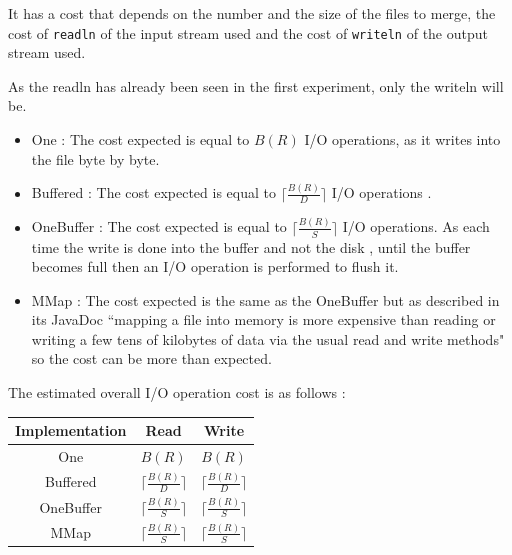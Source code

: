 \documentclass[12pt]{article}
\begin{document}
It has a cost that depends on the number and the size of the files to merge, the cost of \texttt{readln} of the input stream used and the cost of \texttt{writeln} of the output stream used.

As the readln has already been seen in the first experiment, only the writeln will be.

\begin{itemize}
    \item One : The cost expected is equal to $B(R)$ I/O operations, as it writes into the file byte by byte.
    \item Buffered : The cost expected is equal to $\lceil\frac{B(R)}{D}\rceil$ I/O operations \footnotemark.
    \item OneBuffer : The cost expected is equal to $\lceil\frac{B(R)}{S}\rceil$ I/O operations. As each time the write is done into the buffer and not the disk \footnotemark[\value{footnote}], until the buffer becomes full then an I/O operation is performed to flush it.
    \item MMap : The cost expected is the same as the OneBuffer but as described in its JavaDoc ``mapping a file into memory is more expensive than reading or writing a few tens of kilobytes of data via the usual read and write methods" so the cost can be more than expected.
\end{itemize}

The estimated overall I/O operation cost is as follows :

\begin{center}
\begin{tabular}{|c|c|c|}
\hline
\textbf{Implementation} & \textbf{Read} & \textbf{Write}\\
\hline\hline
One & $B(R)$ & $B(R)$\\
[5pt]\hline
Buffered &  $\lceil\frac{B(R)}{D}\rceil$ & $\lceil\frac{B(R)}{D}\rceil$\\
[5pt]\hline
OneBuffer & $\lceil\frac{B(R)}{S}\rceil$ & $\lceil\frac{B(R)}{S}\rceil$\\
[5pt]\hline
MMap & $\lceil\frac{B(R)}{S}\rceil$ & $\lceil\frac{B(R)}{S}\rceil$\\
[5pt]\hline
\end{tabular}
\end{center}
\end{document}

